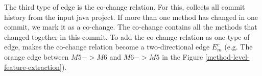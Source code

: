 The third type of edge is the co-change relation. For this,  \tool collects all commit history from the input java project. If more than one method has changed in one commit, we mark it as a co-change. The co-change contains all the methods that changed together in this commit. To add the co-change relation as one type of edge, \tool makes the co-change relation become a two-directional edge $E_m^c$ (e.g. The orange edge between $M5->M6$ and $M6->M5$ in the Figure \ref{method-level-feature-extraction}).
%
